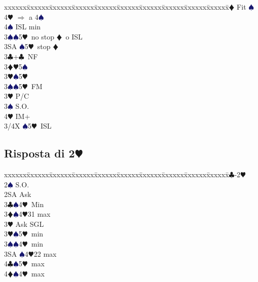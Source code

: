 \documentclass[a4paper,italian]{article}
\newcommand{\BC}{\textcolor{OliveGreen}{$\clubsuit$}}
\newcommand{\BD}{\textcolor{RedOrange}{$\vardiamondsuit$}}
\newcommand{\BH}{\textcolor{Red2}{$\varheartsuit${}}}
\newcommand{\BS}{\textcolor{MidnightBlue}{$\spadesuit${}}}
\newcommand{\pdfh}{\texorpdfstring{\BH{}}{H}}
\newenvironment{bidtable}
{\begin{tabbing}

    xxxxxx\=xxxxxx\=xxxxxx\=xxxxxx\=xxxxxx\=xxxxxx\=xxxxxx\=xxxxxx\=xxxxxx\=xxxxxx\=\kill}
{\end{tabbing} }%
\begin{document}
\begin{multicols}{2}
\begin{bidtable}
        4\BD \> Fit \BS \+\\
        4\BH \> $\Rightarrow$ a 4\BS \+\\
        4\BS \> ISL min\-\-\-\\
        3\BS {}\BS 5\BH\ no stop \BD\ o ISL\\
        3SA \BS 5\BH\ stop \BD \-\\
        3\BC {}+\BC\ NF\+\\
        3\BD {}\BH 5\BS \\
        3\BH {}\BS 5\BH \\
        3\BS {}\BS 5\BH\ FM\-\\
        3\BH \> P/C\+\\
        3\BS \> S.O.\\
        4\BH \> IM+\\
        3/4X \BS 5\BH\ ISL\-\-
    \end{bidtable}

    \subsection{Risposta di 2\pdfh}

    \begin{bidtable}
        1\BC-2\BH\+\\
        2\BS \> S.O.\\
        2SA \> Ask\+\\
        3\BC {}\BS 4\BH\ Min\\
        3\BD {}\BS 4\BH 31 max\+\\
        3\BH \> Ask SGL\-\\
        3\BH {}\BS 5\BH\ min\\
        3\BS {}\BS 4\BH\ min\\
        3SA \BS 4\BH 22 max\\
        4\BC {}\BS 5\BH\ max\\
        4\BD {}\BS 4\BH\ max\-\-
    \end{bidtable}
\end{multicols}
\end{document}
